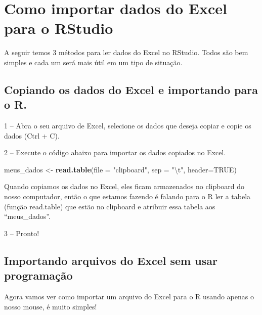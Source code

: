 \documentclass[
]{book}
\newenvironment{Shaded}{\begin{snugshade}}{\end{snugshade}}
\newcommand{\CharTok}[1]{\textcolor[rgb]{0.31,0.60,0.02}{#1}}
\newcommand{\DataTypeTok}[1]{\textcolor[rgb]{0.13,0.29,0.53}{#1}}
\newcommand{\KeywordTok}[1]{\textcolor[rgb]{0.13,0.29,0.53}{\textbf{#1}}}
\newcommand{\NormalTok}[1]{#1}
\newcommand{\OtherTok}[1]{\textcolor[rgb]{0.56,0.35,0.01}{#1}}
\newcommand{\StringTok}[1]{\textcolor[rgb]{0.31,0.60,0.02}{#1}}
\begin{document}
\hypertarget{como-importar-dados-do-excel-para-o-rstudio}{%
\section{Como importar dados do Excel para o
RStudio}\label{como-importar-dados-do-excel-para-o-rstudio}}

A seguir temos 3 métodos para ler dados do Excel no RStudio. Todos são
bem simples e cada um será mais útil em um tipo de situação.

\hypertarget{copiando-os-dados-do-excel-e-importando-para-o-r.}{%
\subsection{Copiando os dados do Excel e importando para o
R.}\label{copiando-os-dados-do-excel-e-importando-para-o-r.}}

1 -- Abra o seu arquivo de Excel, selecione os dados que deseja copiar e
copie os dados (Ctrl + C).

2 -- Execute o código abaixo para importar os dados copiados no Excel.

\begin{Shaded}
\begin{Highlighting}[]
\NormalTok{meus_dados <-}\StringTok{ }\KeywordTok{read.table}\NormalTok{(}\DataTypeTok{file =} \StringTok{"clipboard"}\NormalTok{, }\DataTypeTok{sep =} \StringTok{"}\CharTok{\textbackslash{}t}\StringTok{"}\NormalTok{, }\DataTypeTok{header=}\OtherTok{TRUE}\NormalTok{)}
\end{Highlighting}
\end{Shaded}

Quando copiamos os dados no Excel, eles ficam armazenados no clipboard
do nosso computador, então o que estamos fazendo é falando para o R ler
a tabela (função read.table) que estão no clipboard e atribuir essa
tabela aos ``meus\_dados''.

3 -- Pronto!

\hypertarget{importando-arquivos-do-excel-sem-usar-programauxe7uxe3o}{%
\subsection{Importando arquivos do Excel sem usar
programação}\label{importando-arquivos-do-excel-sem-usar-programauxe7uxe3o}}

Agora vamos ver como importar um arquivo do Excel para o R usando apenas
o nosso mouse, é muito simples!
\end{document}
